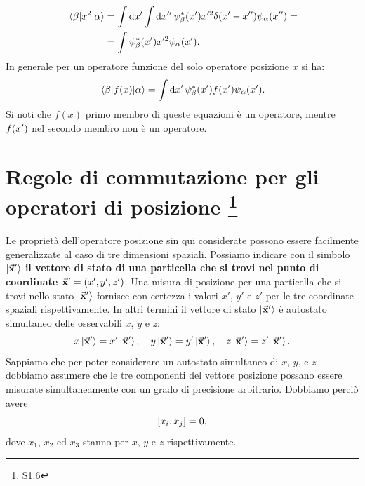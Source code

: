 \begin{align}
  \mel{\beta}{x^2}{\alpha} &=\int\dd{x'}\int\dd{x''} \psi_{\beta}^*\qty(x')x'^2\delta\qty(x'-x'')\psi_{\alpha}\qty(x'') =\nonumber\\
  &= \int\psi_{\beta}^*\qty(x')x'^2\psi_{\alpha}\qty(x') .
\end{align}
In generale per un operatore funzione del solo operatore posizione $x$ si ha:
\begin{equation}
  \mel{\beta}{f(x)}{\alpha} = \int\dd{x'}\psi_{\beta}^*\qty(x')f\qty(x')\psi_{\alpha}\qty(x') .
\end{equation}
Si noti che $f(x)$ primo membro di queste equazioni è un operatore, mentre $f\qty(x')$ nel secondo membro non è un operatore.
\section[Regole di commutazione per gli operatori di posizione]{Regole di commutazione per gli operatori di posizione \footnote{S1.6}}
Le proprietà dell'operatore posizione sin qui considerate possono essere facilmente generalizzate al caso di tre dimensioni spaziali.
Possiamo indicare con il simbolo $\ket{\va{x}'}$ \textbf{il vettore di stato di una particella che si trovi nel punto di coordinate $\va{x}'= \qty(x',y',z')$}.
Una misura di posizione per una particella che si trovi nello stato $\ket{\va{x}'}$ fornisce con certezza i valori $x'$, $y'$ e $z'$ per le tre coordinate spaziali rispettivamente. In altri termini il vettore di stato $\ket{\va{x}'}$ è autostato simultaneo delle osservabili $x$, $y$ e $z$:
\begin{equation}
  x\ket{\va{x}'}=x'\ket{\va{x}'},\quad y\ket{\va{x}'}=y'\ket{\va{x}'},\quad z\ket{\va{x}'}=z'\ket{\va{x}'} .
\end{equation}
Sappiamo che per poter considerare un autostato simultaneo di $x$, $y$, e $z$ dobbiamo assumere che le tre componenti del vettore posizione possano essere misurate simultaneamente con un grado di precisione arbitrario. Dobbiamo perciò avere
\begin{equation}
  \comm{x_i}{x_j}= 0 ,
\end{equation}
dove $x_1$, $x_2$ ed $x_3$ stanno per $x$, $y$ e $z$ rispettivamente.